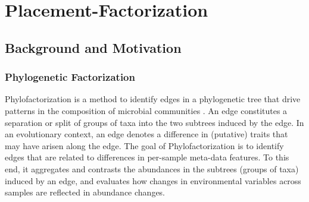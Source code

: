 
\chapter{Placement-Factorization}
\label{ch:Factorization}




\section{Background and Motivation}
\label{ch:Factorization:sec:Motivation}


\subsection*{Phylogenetic Factorization}
\label{sec:Factorization:sub:PhyloFactorization}

Phylofactorization is a method to identify edges in a phylogenetic tree
that drive patterns in the composition of microbial communities \cite{Washburne2017a}.
An edge constitutes a separation or split of groups of taxa into the two subtrees induced by the edge.
In an evolutionary context, an edge denotes a difference in (putative) traits that may have arisen along the edge.
The goal of Phylofactorization is to identify edges that are related to differences in per-sample meta-data features.
To this end, it aggregates and contrasts the abundances in the subtrees (groups of taxa) induced by an edge,
and evaluates how changes in environmental variables across samples are reflected in abundance changes.

